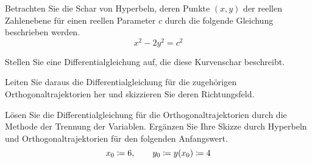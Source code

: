\begin{atiTask}[
	title = Orthogonaltrajektorien und Richtungsfeld,
	language = Deutsch
]
	Betrachten Sie die Schar von Hyperbeln, deren Punkte $(x,y)$ der reellen Zahlenebene für einen reellen Parameter $c$ durch die folgende Gleichung beschrieben werden.
	\[
		x^2 - 2y^2 = c^2
	\]
	\begin{atiSubtasks}
		\item{
			Stellen Sie eine Differentialgleichung auf, die diese Kurvenschar beschreibt.
		}
		\item{
			Leiten Sie daraus die Differentialgleichung für die zugehörigen Orthogonaltrajektorien her und skizzieren Sie deren Richtungsfeld.
		}
		\item{
			Lösen Sie die Differentialgleichung für die Orthogonaltrajektorien durch die Methode der Trennung der Variablen. Ergänzen Sie Ihre Skizze durch Hyperbeln und Orthogonaltrajektorien für den folgenden Anfangswert.
			\[
				x_0\coloneqq 6,\qquad y_0\coloneqq y(x_0)\coloneqq 4
			\]
		}
	\end{atiSubtasks}
\end{atiTask}
